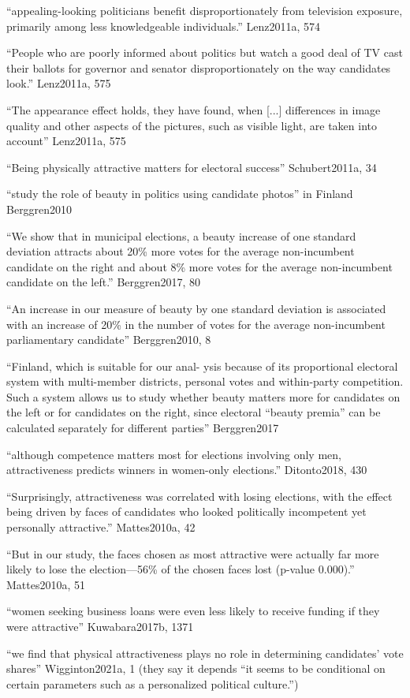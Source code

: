 ``appealing-looking politicians benefit disproportionately from television exposure, primarily among less knowledgeable individuals.'' Lenz2011a, 574

``People who are poorly informed about politics but watch a good deal of TV cast their ballots for governor and senator disproportionately on the way candidates look.'' Lenz2011a, 575

``The appearance effect holds, they have found, when [...] differences in image quality and other aspects of the pictures, such as visible light, are taken into account'' Lenz2011a, 575

``Being physically attractive matters for electoral success'' Schubert2011a, 34


		``study the role of beauty in politics using candidate photos'' in Finland Berggren2010

		``We show that in municipal elections, a beauty increase of one standard deviation attracts about 20\% more votes for the average non-incumbent candidate on the right and about 8\% more votes for the average non-incumbent candidate on the left.'' Berggren2017, 80

		``An increase in our measure of beauty by one standard deviation is associated with an increase of 20\% in the number of votes for the average non-incumbent parliamentary candidate'' Berggren2010, 8

		``Finland, which is suitable for our anal- ysis because of its proportional electoral system with multi-member districts, personal votes and within-party competition. Such a system allows us to study whether beauty matters more for candidates on the left or for candidates on the right, since electoral “beauty premia” can be calculated separately for different parties'' Berggren2017


		``although competence matters most for elections involving only men, attractiveness predicts winners in women-only elections.'' Ditonto2018, 430

		``Surprisingly, attractiveness was correlated with losing elections, with the effect being driven by faces of candidates who looked politically incompetent yet personally attractive.'' Mattes2010a, 42

		``But in our study, the faces chosen as most attractive were actually far more likely to lose the election—56\% of the chosen faces lost (p-value 0.000).'' Mattes2010a, 51

		``women seeking business loans were even less likely to receive funding if they were attractive'' Kuwabara2017b, 1371

		``we find that physical attractiveness plays no role in determining candidates’ vote shares'' Wigginton2021a, 1 (they say it depends ``it seems to be conditional on certain parameters such as a personalized political culture.'')